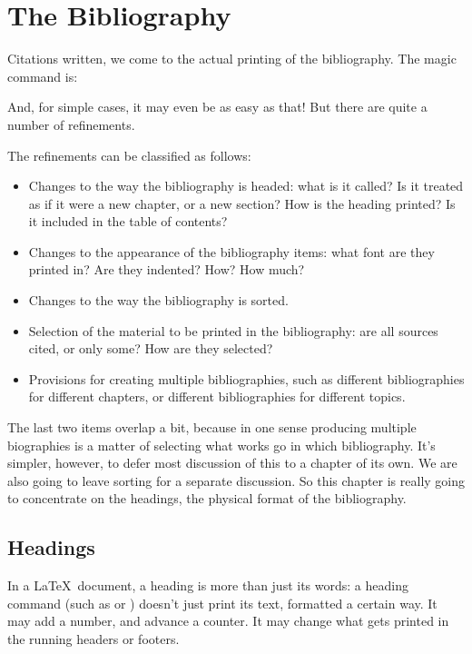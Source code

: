 \chapter{The Bibliography}

Citations written, we come to the actual printing of the
bibliography. The magic command is:
\begin{center}
\end{center}
And, for simple cases, it may even be as easy as that! But there are
quite a number of refinements.

The refinements can be classified as follows:
\begin{itemize}
\item Changes to the way the bibliography is headed: what is it
  called? Is it treated as if it were a new chapter, or a new section?
  How is the heading printed? Is it included in the table of contents?
\item Changes to the appearance of the bibliography items: what font
  are they printed in? Are they indented? How? How much?
\item Changes to the way the bibliography is sorted.
\item Selection of the material to be printed in the bibliography: are
  all sources cited, or only some? How are they selected?
\item Provisions for creating multiple bibliographies, such as
  different bibliographies for different chapters, or different
  bibliographies for different topics.
\end{itemize}
The last two items overlap a bit, because in one sense producing
multiple biographies is a matter of selecting what works go in which
bibliography. It's simpler, however, to defer most discussion of this
to a chapter of its own. We are
also going to leave sorting for a separate discussion. So this chapter
is really going to concentrate on the headings, the physical format of
the bibliography.

\section{Headings}

In a \LaTeX\ document, a heading is more than just its words: a
heading command (such as  or ) doesn't just
print its text, formatted a certain way. It may add a number, and
advance a counter. It may change what gets printed in the running
headers or footers.

